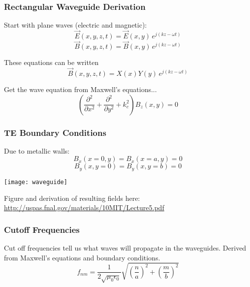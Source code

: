 \documentclass[professionalfonts,t]{beamer}
\begin{document}
{\begin{frame}
\frametitle{Rectangular Waveguide Derivation}
		Start with plane waves (electric and magnetic):
	\begin{equation}
	\vec{E}\left(x,y,z,t\right) =\vec{E}\left(x,y\right)\,e^{j\left(kz-\omega t\right)}
	\end{equation}
	\begin{equation}
	\vec{B}\left(x,y,z,t\right) =\vec{B}\left(x,y\right)\,e^{j\left(kz-\omega t\right)}
	\end{equation}
	
	These equations can be written
	\begin{equation}
		\vec{B}\left(x,y,z,t\right) =X\left(x\right)Y\left(y\right)\,e^{j\left(kz-\omega t\right)}
	\end{equation}
	
	Get the wave equation from Maxwell's equations...
	\begin{equation}
		\left(\frac{\partial^2}{\partial x^2} + \frac{\partial^2}{\partial y^2} + k^2_c\right)
		B_z\left(x,y\right)=0
	\end{equation}
\end{frame}


\begin{frame}
\frametitle{TE Boundary Conditions}
\vspace{-0.5em}
	Due to metallic walls:
		\begin{equation}
			B_x\left(x=0,y\right) = B_x\left(x=a,y\right)= 0
		\end{equation}
		\begin{equation}
			B_y\left(x,y=0\right) = B_y\left(x,y=b\right)=0
		\end{equation}
		
\vspace{-1em}

\begin{center}
\texttt{[image: waveguide]}
\end{center}

\vspace{-1.5em}

Figure and derivation of resulting fields here:	
\small\url{http://uspas.fnal.gov/materials/10MIT/Lecture5.pdf}
\end{frame}

\begin{frame}
	\frametitle{Cutoff Frequencies}
	Cut off frequencies tell us what waves will propagate in the waveguides. 
	Derived from Maxwell's equations and boundary conditions.
	\begin{equation}
		f_{nm} = \frac{1}{2\sqrt{\mu_0 \epsilon_0}}\sqrt{\left(\frac{n}{a}\right)^2+\left(\frac{m}{b}\right)^2}
	\end{equation}
	

\end{frame}}
\end{document}
